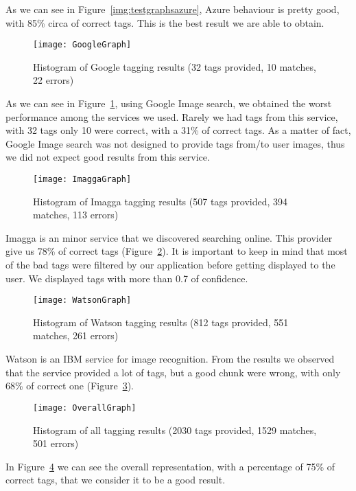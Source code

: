 As we can see in Figure~\ref{img:testgraphsazure}, Azure behaviour is pretty 
good, with 85\% circa of correct tags. This is the best result we are able to 
obtain.

\begin{figure}[H]
\centering
\texttt{[image: GoogleGraph]}
\caption{Histogram of Google tagging results (32 tags provided, 10 matches, 22 
errors)}
\label{img:testgraphgoogle}
\end{figure}

As we can see in Figure~\ref{img:testgraphgoogle}, using Google Image search, we 
obtained the worst performance among the services we used. Rarely we had tags 
from this service, with 32 tags only 10 were correct, with a 31\% of correct 
tags. As a matter of fact, Google Image search was not designed to provide tags 
from/to user images, thus we did not expect good results from this service.

\begin{figure}[H]
\centering
\texttt{[image: ImaggaGraph]}
\caption{Histogram of Imagga tagging results (507 tags provided, 394 matches, 
113 errors)}
\label{img:testgraphimagga}
\end{figure}

Imagga is an minor service that we discovered searching online. This provider 
give us 78\% of correct tags (Figure~\ref{img:testgraphimagga}). It is important 
to keep in mind that most of the bad tags were filtered by our application 
before getting displayed to the user. We displayed tags with more than 0.7 of 
confidence.

\begin{figure}[H]
\centering
\texttt{[image: WatsonGraph]}
\caption{Histogram of Watson tagging results (812 tags provided, 551 matches, 
261 errors)}
\label{img:testgraphwatson}
\end{figure}

Watson is an IBM service for image recognition. From the results we observed 
that the service provided a lot of tags, but a good chunk were wrong, with only 
68\% of correct one (Figure~\ref{img:testgraphwatson}).

\begin{figure}[H]
\centering
\texttt{[image: OverallGraph]}
\caption{Histogram of all tagging results (2030 tags provided, 1529 matches, 501 
errors)}
\label{img:testgraphoverall}
\end{figure}

In Figure~\ref{img:testgraphoverall} we can see the overall representation, with 
a percentage of 75\% of correct tags, that we consider it to be a good result.

